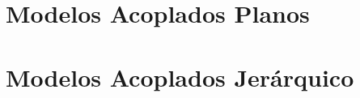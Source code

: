 \documentclass{beamer}
\begin{document}


\section{Modelos Acoplados Planos}

\section{Modelos Acoplados Jerárquico}
\end{document}
